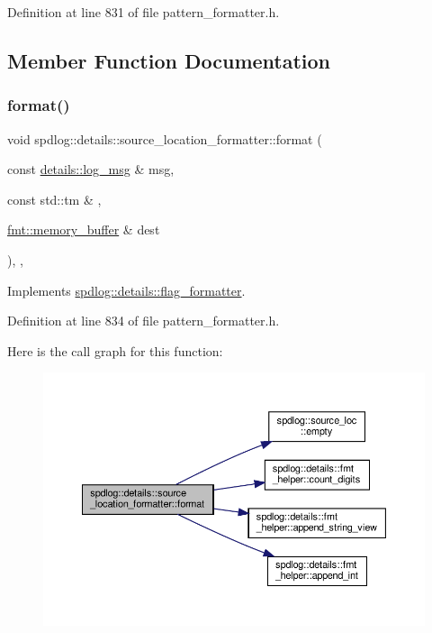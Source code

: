 Definition at line 831 of file pattern\+\_\+formatter.\+h.



\subsection{Member Function Documentation}
\mbox{\label{classspdlog_1_1details_1_1source__location__formatter_af0d34490d35c582fdb1553a27f03e147}} 
\subsubsection{\texorpdfstring{format()}{format()}}
{\footnotesize\ttfamily void spdlog\+::details\+::source\+\_\+location\+\_\+formatter\+::format (\begin{DoxyParamCaption}\item[{const \hyperlink{structspdlog_1_1details_1_1log__msg}{details\+::log\+\_\+msg} \&}]{msg,  }\item[{const std\+::tm \&}]{,  }\item[{\hyperlink{format_8h_a21cbf729f69302f578e6db21c5e9e0d2}{fmt\+::memory\+\_\+buffer} \&}]{dest }\end{DoxyParamCaption})\hspace{0.3cm}{\ttfamily [inline]}, {\ttfamily [override]}, {\ttfamily [virtual]}}



Implements \hyperlink{classspdlog_1_1details_1_1flag__formatter_a33fb3e42a4c8200cceb833d92b53fb67}{spdlog\+::details\+::flag\+\_\+formatter}.



Definition at line 834 of file pattern\+\_\+formatter.\+h.

Here is the call graph for this function\+:
\nopagebreak
\begin{figure}[H]
\begin{center}
\leavevmode
\includegraphics[width=350pt]{classspdlog_1_1details_1_1source__location__formatter_af0d34490d35c582fdb1553a27f03e147_cgraph}
\end{center}
\end{figure}


